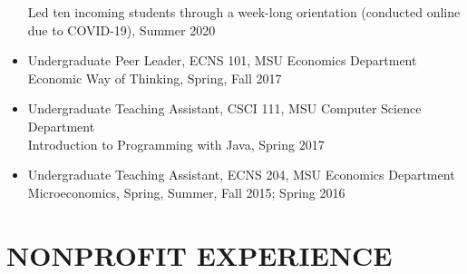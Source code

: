 \documentclass[11pt]{article}
\begin{document}
\begin{itemize}[left=0pt]
    Led ten incoming students through a week-long orientation (conducted online due to COVID-19), Summer 2020
    \item Undergraduate Peer Leader, ECNS 101, MSU Economics Department \\
    Economic Way of Thinking, Spring, Fall 2017
    \item Undergraduate Teaching Assistant, CSCI 111, MSU Computer Science Department \\
    Introduction to Programming with Java, Spring 2017
    \item Undergraduate Teaching Assistant, ECNS 204, MSU Economics Department \\
    Microeconomics, Spring, Summer, Fall 2015; Spring 2016
\end{itemize}

\section*{NONPROFIT EXPERIENCE}
\end{document}
